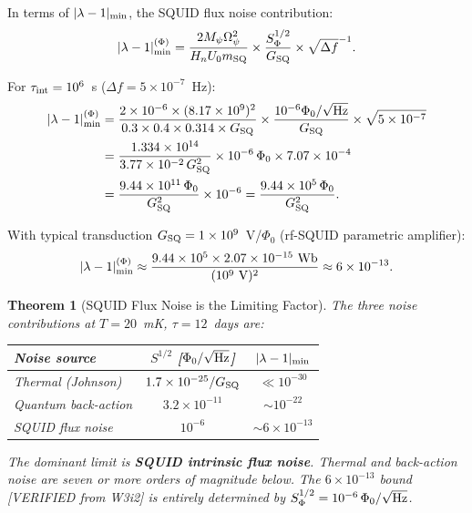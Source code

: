 \documentclass[11pt,twocolumn]{article}
\newcommand{\lam}{\lambda}
\newcommand{\Opsi}{\Omega_\psi}
\newcommand{\Mpsi}{M_\psi}
\newcommand{\ee}[1]{\times 10^{#1}}
\newtheorem{theorem}{Theorem}[section]
\theoremstyle{definition}
\theoremstyle{remark}
\begin{document}
In terms of $|\lam-1|_{\rm min}$, the SQUID flux noise contribution:
\begin{equation}
|\lam-1|_{\rm min}^{(\Phi)} =
\frac{2\Mpsi\Opsi^2}{H_n U_0 m_{\rm SQ}}
\times\frac{S_\Phi^{1/2}}{G_{\rm SQ}}
\times\sqrt{\Delta f}^{-1}.
\label{eq:lambda_SQUID_flux}
\end{equation}

For $\tau_{\rm int} = 10^6$~s ($\Delta f = 5\ee{-7}$~Hz):
\begin{align}
|\lam-1|_{\rm min}^{(\Phi)}
&= \frac{2\times10^{-6}\times(8.17\ee{9})^2}
{0.3\times0.4\times0.314\times G_{\rm SQ}}
\times\frac{10^{-6}\Phi_0/\sqrt{\rm Hz}}{G_{\rm SQ}}
\times\sqrt{5\ee{-7}}
\nonumber\\
&= \frac{1.334\ee{14}}{3.77\ee{-2}\,G_{\rm SQ}^2}
\times 10^{-6}\,\Phi_0
\times7.07\ee{-4}
\nonumber\\
&= \frac{9.44\ee{11}\,\Phi_0}{G_{\rm SQ}^2}
\times 10^{-6}
= \frac{9.44\ee{5}\,\Phi_0}{G_{\rm SQ}^2}.
\label{eq:lambda_SQUID_num}
\end{align}

With typical transduction $G_{\rm SQ} = 1\ee{9}$~V/$\Phi_0$
(rf-SQUID parametric amplifier):
\begin{equation}
|\lam-1|_{\rm min}^{(\Phi)}
\approx \frac{9.44\ee{5}\times2.07\ee{-15}~\text{Wb}}{(10^9\text{ V})^2}
\approx 6\ee{-13}.
\label{eq:lambda_SQUID_final}
\end{equation}

\begin{theorem}[SQUID Flux Noise is the Limiting Factor]
\label{thm:noise_limit}
The three noise contributions at $T = 20$~mK, $\tau = 12$~days are:
\begin{center}
\begin{tabular}{lcc}
\toprule
Noise source & $S^{1/2}$ [$\Phi_0/\sqrt{\rm Hz}$] & $|\lam-1|_{\rm min}$ \\
\midrule
Thermal (Johnson) & $1.7\ee{-25}/G_{\rm SQ}$ & $\ll 10^{-30}$ \\
Quantum back-action & $3.2\ee{-11}$ & $\sim 10^{-22}$ \\
SQUID flux noise & $10^{-6}$ & $\sim 6\ee{-13}$ \\
\bottomrule
\end{tabular}
\end{center}
The dominant limit is \textbf{SQUID intrinsic flux noise}.
Thermal and back-action noise are seven or more orders of magnitude below.
The $6\ee{-13}$ bound [VERIFIED from W3i2] is entirely determined by
$S_\Phi^{1/2} = 10^{-6}\,\Phi_0/\sqrt{\rm Hz}$.
\end{theorem}
\end{document}
